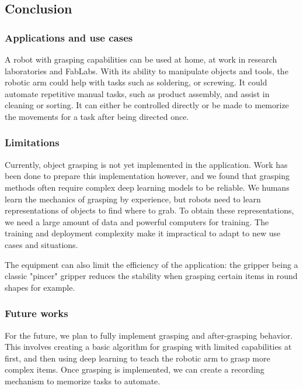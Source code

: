 



\subsection{Conclusion}

\subsubsection{Applications and use cases}

A robot with grasping capabilities can be used at home, at work in research laboratories and FabLabs. With its ability to manipulate objects and tools, the robotic arm could help with tasks such as soldering, or screwing. It could automate repetitive manual tasks, such as product assembly, and assist in cleaning or sorting. It can either be controlled directly or be made to memorize the movements for a task after being directed once.

\subsubsection{Limitations}

Currently, object grasping is not yet implemented in the application. Work has been done to prepare this implementation however, and we found that grasping methods often require complex deep learning models to be reliable. We humans learn the mechanics of grasping by experience, but robots need to learn representations of objects to find where to grab. To obtain these representations, we need a large amount of data and powerful computers for training. The training and deployment complexity make it impractical to adapt to new use cases and situations.

The equipment can also limit the efficiency of the application: the gripper being a classic "pincer" gripper reduces the stability when grasping certain items in round shapes for example.

\subsubsection{Future works}

For the future, we plan to fully implement grasping and after-grasping behavior. This involves creating a basic algorithm for grasping with limited capabilities at first, and then using deep learning to teach the robotic arm to grasp more complex items. Once grasping is implemented, we can create a recording mechanism to memorize tasks to automate.

